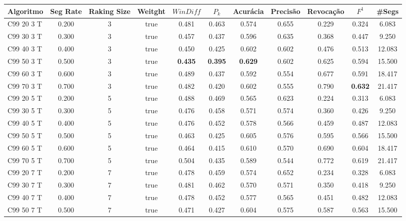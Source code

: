 \documentclass{article}
\begin{document}
\begin{longtable}[c]{|l|c|c|c|c|c|c|c|c|c|c|} 
\hline 
Algoritmo & Seg Rate & Raking Size & Weitght & $WinDiff$ & $P_k$ & Acurácia & Precisão & Revocação & $F^1$ & \#Segs\\ \hline 
C99 20  3 T & 0.200 & 3 & true & 0.481 & 0.463 & 0.574 & 0.655 & 0.229 & 0.324 & 6.083  \\ \hline 
 C99 30  3 T & 0.300 & 3 & true & 0.457 & 0.437 & 0.596 & 0.635 & 0.368 & 0.447 & 9.250  \\ \hline 
 C99 40  3 T & 0.400 & 3 & true & 0.450 & 0.425 & 0.602 & 0.602 & 0.476 & 0.513 & 12.083  \\ \hline 
 C99 50  3 T & 0.500 & 3 & true & \cellcolor{gray!20} \textbf{0.435} & \cellcolor{gray!20} \textbf{0.395} & \cellcolor{gray!20} \textbf{0.629} & 0.602 & 0.625 & 0.594 & 15.500  \\ \hline 
 C99 60  3 T & 0.600 & 3 & true & 0.489 & 0.437 & 0.592 & 0.554 & 0.677 & 0.591 & 18.417  \\ \hline 
 C99 70  3 T & 0.700 & 3 & true & 0.482 & 0.420 & 0.602 & 0.555 & 0.790 & \cellcolor{gray!20} \textbf{0.632} & 21.417  \\ \hline 
 C99 20  5 T & 0.200 & 5 & true & 0.488 & 0.469 & 0.565 & 0.623 & 0.224 & 0.313 & 6.083  \\ \hline 
 C99 30  5 T & 0.300 & 5 & true & 0.476 & 0.458 & 0.571 & 0.574 & 0.360 & 0.426 & 9.250  \\ \hline 
 C99 40  5 T & 0.400 & 5 & true & 0.476 & 0.452 & 0.578 & 0.566 & 0.459 & 0.487 & 12.083  \\ \hline 
 C99 50  5 T & 0.500 & 5 & true & 0.463 & 0.425 & 0.605 & 0.576 & 0.595 & 0.566 & 15.500  \\ \hline 
 C99 60  5 T & 0.600 & 5 & true & 0.464 & 0.415 & 0.610 & 0.570 & 0.690 & 0.604 & 18.417  \\ \hline 
 C99 70  5 T & 0.700 & 5 & true & 0.504 & 0.435 & 0.589 & 0.544 & 0.772 & 0.619 & 21.417  \\ \hline 
 C99 20  7 T & 0.200 & 7 & true & 0.478 & 0.459 & 0.574 & 0.652 & 0.234 & 0.328 & 6.083  \\ \hline 
 C99 30  7 T & 0.300 & 7 & true & 0.481 & 0.462 & 0.570 & 0.571 & 0.350 & 0.418 & 9.250  \\ \hline 
 C99 40  7 T & 0.400 & 7 & true & 0.478 & 0.452 & 0.577 & 0.565 & 0.451 & 0.482 & 12.083  \\ \hline 
 C99 50  7 T & 0.500 & 7 & true & 0.471 & 0.427 & 0.604 & 0.575 & 0.587 & 0.563 & 15.500  \\ \hline 

\end{longtable}
\end{document}

